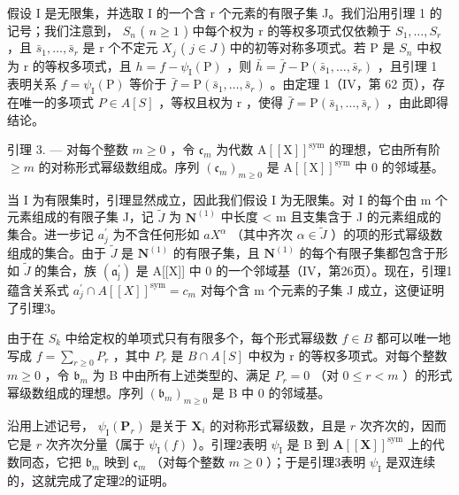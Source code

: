假设 I 是无限集，并选取 I 的一个含 r 个元素的有限子集 J。我们沿用引理 1 的记号；我们注意到， \(S_{n}\) ( \(n \geqslant 1\) ) 中每个权为 r 的等权多项式仅依赖于 \(S_{1}, \ldots, S_{r}\) ，且 \(\bar{s}_{1}, \ldots, \bar{s}_{r}\) 是 r 个不定元 \(X_{j}\) ( \(j \in J\) ) 中的初等对称多项式。若 P 是 \(S_{n}\) 中权为 r 的等权多项式，且 \(h = f - \psi_{\mathrm{I}}(\mathrm{P})\) ，则 \(\bar{h} = \bar{f} - \mathrm{P}(\bar{s}_{1}, \ldots, \bar{s}_{r})\) ，且引理 1 表明关系 \(f = \psi_{\mathrm{I}}(\mathrm{P})\) 等价于 \(\bar{f} = \mathrm{P}(\bar{s}_{1}, \ldots, \bar{s}_{r})\) 。由定理 1（IV，第 62 页），存在唯一的多项式 \(P \in A[S]\) ，等权且权为 r ，使得 \(\bar{f} = \mathrm{P}(\bar{s}_{1}, \ldots, \bar{s}_{r})\) ，由此即得结论。

引理 3. --- 对每个整数 \(m \geqslant 0\) ，令 \(\mathfrak{c}_m\) 为代数 \(\mathrm{A}[[\mathrm{X}]]^{\mathrm{sym}}\) 的理想，它由所有阶 \(\geqslant m\) 的对称形式幂级数组成。序列 \((\mathfrak{c}_m)_{m \geqslant 0}\) 是 \(\mathrm{A}[[\mathrm{X}]]^{\mathrm{sym}}\) 中 0 的邻域基。

当 I 为有限集时，引理显然成立，因此我们假设 I 为无限集。对 I 的每个由 m 个元素组成的有限子集 J，记 \(\tilde{J}\) 为 \(\mathbf{N}^{(1)}\) 中长度 \textless{} m 且支集含于 J 的元素组成的集合。进一步记 \(a_{j}^{\prime}\) 为不含任何形如 \(aX^{\alpha}\) （其中齐次 \(\alpha \in \tilde{J}\) ）的项的形式幂级数组成的集合。由于 \(\tilde{J}\) 是 \(\mathbf{N}^{(1)}\) 的有限子集，且 \(\mathbf{N}^{(1)}\) 的每个有限子集都包含于形如 \(\tilde{J}\) 的集合，族 \((\mathfrak{a}_{\mathrm{j}}^{\prime})\) 是 A{[}{[}X{]}{]} 中 0 的一个邻域基（IV，第26页）。现在，引理1蕴含关系式 \(a_{j}^{\prime} \cap A[[X]]^{\text{sym}} = c_{m}\) 对每个含 m 个元素的子集 J 成立，这便证明了引理3。

由于在 \(S_{k}\) 中给定权的单项式只有有限多个，每个形式幂级数 \(f \in B\) 都可以唯一地写成 \(f = \sum_{r \geqslant 0} P_{r}\) ，其中 \(P_{r}\) 是 \(B \cap A[S]\) 中权为 r 的等权多项式。对每个整数 \(m \geqslant 0\) ，令 \(\mathfrak{b}_m\) 为 B 中由所有上述类型的、满足 \(P_r = 0\) （对 \(0 \leqslant r < m\) ）的形式幂级数组成的理想。序列 \((\mathfrak{b}_m)_{m \geqslant 0}\) 是 B 中 0 的邻域基。

沿用上述记号， \(\psi_{\mathrm{I}}(\mathbf{P}_{r})\) 是关于 \(\mathbf{X}_i\) 的对称形式幂级数，且是 \(r\) 次齐次的，因而它是 \(r\) 次齐次分量（属于 \(\psi_{\mathrm{I}}(f)\) ）。引理2表明 \(\psi_{\mathrm{I}}\) 是 B 到 \(\mathbf{A}[[\mathbf{X}]]^{\mathrm{sym}}\) 上的代数同态，它把 \(\mathfrak{b}_m\) 映到 \(\mathfrak{c}_m\) （对每个整数 \(m \geqslant 0\) ）；于是引理3表明 \(\psi_{\mathrm{I}}\) 是双连续的，这就完成了定理2的证明。


